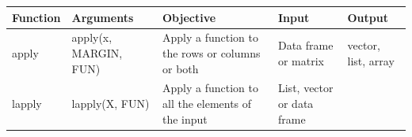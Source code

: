 \documentclass[]{book}
\theoremstyle{definition}
\theoremstyle{definition}
\theoremstyle{definition}
\theoremstyle{remark}
\begin{document}
\begin{longtable}[]{@{}lllll@{}}
\toprule
\begin{minipage}[b]{0.17\columnwidth}\raggedright
Function\strut
\end{minipage} & \begin{minipage}[b]{0.17\columnwidth}\raggedright
Arguments\strut
\end{minipage} & \begin{minipage}[b]{0.17\columnwidth}\raggedright
Objective\strut
\end{minipage} & \begin{minipage}[b]{0.17\columnwidth}\raggedright
Input\strut
\end{minipage} & \begin{minipage}[b]{0.17\columnwidth}\raggedright
Output\strut
\end{minipage}\tabularnewline
\midrule
\endhead
\begin{minipage}[t]{0.17\columnwidth}\raggedright
apply\strut
\end{minipage} & \begin{minipage}[t]{0.17\columnwidth}\raggedright
apply(x, MARGIN, FUN)\strut
\end{minipage} & \begin{minipage}[t]{0.17\columnwidth}\raggedright
Apply a function to the rows or columns or both\strut
\end{minipage} & \begin{minipage}[t]{0.17\columnwidth}\raggedright
Data frame or matrix\strut
\end{minipage} & \begin{minipage}[t]{0.17\columnwidth}\raggedright
vector, list, array\strut
\end{minipage}\tabularnewline
\begin{minipage}[t]{0.17\columnwidth}\raggedright
lapply\strut
\end{minipage} & \begin{minipage}[t]{0.17\columnwidth}\raggedright
lapply(X, FUN)\strut
\end{minipage} & \begin{minipage}[t]{0.17\columnwidth}\raggedright
Apply a function to all the elements of the input\strut
\end{minipage} & \begin{minipage}[t]{0.17\columnwidth}\raggedright
List, vector or data frame\strut
\end{minipage} & \begin{minipage}[t]{0.17\columnwidth}\raggedright

\end{minipage}
\end{longtable}
\end{document}
